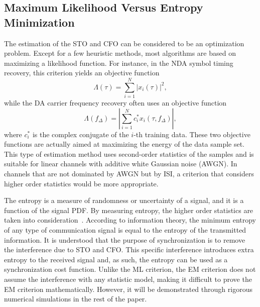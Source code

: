 \documentclass[12pt, draftclsnofoot, onecolumn]{IEEEtran}
\begin{document}
\subsection{Maximum Likelihood Versus Entropy Minimization}
\label{sec:versus}
The estimation of the STO and CFO can be considered to be an optimization problem.
Except for a few heuristic methods, most algorithms are based on maximizing a likelihood function.
For instance, in the NDA symbol timing recovery, this criterion yields an objective function~\cite{mengali1997synchronization}
\begin{equation}
\Lambda(\tau) =\sum\limits_{i = 1}^N {{{\left| {{x_i}( \tau )} \right|}^2}}, 
\end{equation}
while the DA carrier frequency recovery often uses an objective function~\cite{mengali1997synchronization} 
\begin{equation}
\Lambda ({f_\Delta })=\left| \sum\limits_{i = 1}^N {{{{c_i^*{x_i}(\tau ,{f_\Delta })}}}} \right|, 
\end{equation}
where \(c_i^*\) is the complex conjugate of the \(i\)-th training data.
These two objective functions are actually aimed at maximizing the energy of the data sample set.
This type of estimation method uses second-order statistics of the samples and is suitable for linear channels with additive white Gaussian noise (AWGN).
In channels that are not dominated by AWGN but by ISI, a criterion that considers higher order statistics would be more appropriate.

The entropy is a measure of randomness or uncertainty of a signal, and it is a function of the signal PDF.
By measuring entropy, the higher order statistics are taken into consideration~\cite{Santamaria2002}.
According to information theory, the minimum entropy of any type of communication signal is equal to the entropy of the transmitted information. 
It is understood that the purpose of synchronization is to remove the interference due to STO and CFO.  This specific interference introduces extra entropy to the received signal and, as such, the entropy can be used as a synchronization cost function.
Unlike the ML criterion, the EM criterion does not assume the interference with any statistic model,
making it difficult to prove the EM criterion mathematically.
However, it will be demonstrated through rigorous numerical simulations in the rest of the paper.
\end{document}

